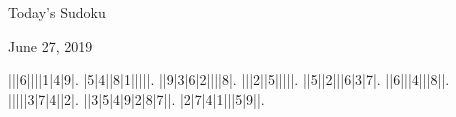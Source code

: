 \documentclass{article}
\begin{document}
\begin{center}
\Huge{Today's Sudoku}
\end{center}
\begin{center}
\Large{June 27, 2019}
\end{center}
\begin{sudoku}
|||6||||1|4|9|.
|5|4||8|1|||||.
||9|3|6|2||||8|.
|||2||5|||||.
||5||2|||6|3|7|.
||6|||4|||8||.
|||||3|7|4||2|.
||3|5|4|9|2|8|7||.
|2|7|4|1|||5|9||.
\end{sudoku}
\end{document}

